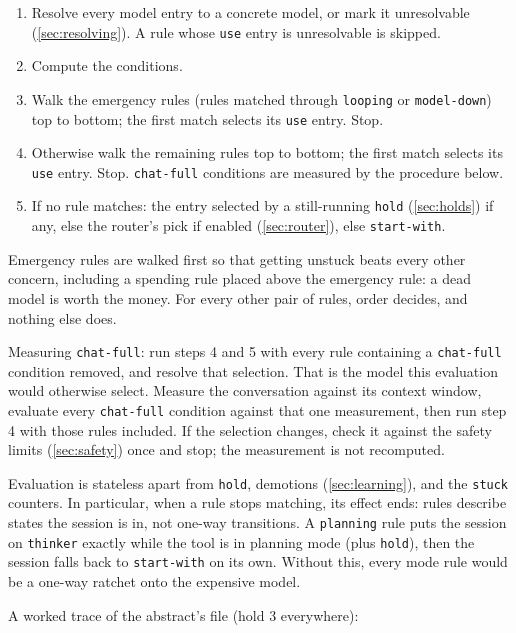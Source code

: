 \documentclass[11pt]{article}
\newcommand{\key}[1]{\texttt{#1}}
\begin{document}
\begin{enumerate}
  \item Resolve every model entry to a concrete model, or mark it
        unresolvable (\ref{sec:resolving}). A rule whose \key{use} entry is
        unresolvable is skipped.
  \item Compute the conditions.
  \item Walk the emergency rules (rules matched through \key{looping} or
        \key{model-down}) top to bottom; the first match selects its
        \key{use} entry. Stop.
  \item Otherwise walk the remaining rules top to bottom; the first match
        selects its \key{use} entry. Stop. \key{chat-full} conditions are
        measured by the procedure below.
  \item If no rule matches: the entry selected by a still-running \key{hold}
        (\ref{sec:holds}) if any, else the router's pick if enabled
        (\ref{sec:router}), else \key{start-with}.
\end{enumerate}

Emergency rules are walked first so that getting unstuck beats every
other concern, including a spending rule placed above the emergency
rule: a dead model is worth the money. For every other pair of rules,
order decides, and nothing else does.

Measuring \key{chat-full}: run steps 4 and 5 with every rule containing
a \key{chat-full} condition removed, and resolve that selection. That is
the model this evaluation would otherwise select. Measure the
conversation against its context window, evaluate every \key{chat-full}
condition against that one measurement, then run step 4 with those rules
included. If the selection changes, check it against the safety limits
(\ref{sec:safety}) once and stop; the measurement is not recomputed.

Evaluation is stateless apart from \key{hold}, demotions
(\ref{sec:learning}), and the \key{stuck} counters. In particular, when a
rule stops matching, its effect ends: rules describe states the session is
in, not one-way transitions. A \key{planning} rule puts the session on
\key{thinker} exactly while the tool is in planning mode (plus \key{hold}),
then the session falls back to \key{start-with} on its own. Without this,
every mode rule would be a one-way ratchet onto the expensive model.

A worked trace of the abstract's file (hold 3 everywhere):
\end{document}
